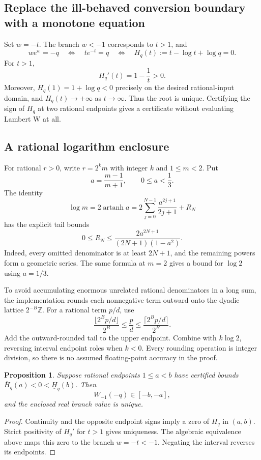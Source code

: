 \documentclass[11pt,letterpaper]{article}
\newtheorem{proposition}{Proposition}
\begin{document}
\subsection{Replace the ill-behaved conversion boundary with a monotone equation}

Set $w=-t$. The branch $w<-1$ corresponds to $t>1$, and
\[
 we^w=-q
 \quad\Longleftrightarrow\quad
 te^{-t}=q
 \quad\Longleftrightarrow\quad
 H_q(t):=t-\log t+\log q=0.
\]
For $t>1$,
\[
 H_q'(t)=1-\frac1t>0.
\]
Moreover, $H_q(1)=1+\log q<0$ precisely on the desired rational-input domain, and $H_q(t)\to+\infty$ as $t\to\infty$. Thus the root is unique. Certifying the sign of $H_q$ at two rational endpoints gives a certificate without evaluating Lambert W at all.

\subsection{A rational logarithm enclosure}

For rational $r>0$, write $r=2^k m$ with integer $k$ and $1\le m<2$. Put
\[
 a=\frac{m-1}{m+1},\qquad 0\le a<\frac13.
\]
The identity
\[
 \log m=2\operatorname{artanh}a
 =2\sum_{j=0}^{N-1}\frac{a^{2j+1}}{2j+1}+R_N
\]
has the explicit tail bounds
\[
 0\le R_N\le
 \frac{2a^{2N+1}}{(2N+1)(1-a^2)}.
\]
Indeed, every omitted denominator is at least $2N+1$, and the remaining powers form a geometric series. The same formula at $m=2$ gives a bound for $\log2$ using $a=1/3$.

To avoid accumulating enormous unrelated rational denominators in a long sum, the implementation rounds each nonnegative term outward onto the dyadic lattice $2^{-B}\mathbb Z$. For a rational term $p/d$, use
\[
 \frac{\lfloor2^B p/d\rfloor}{2^B}
 \le\frac pd\le
 \frac{\lceil2^B p/d\rceil}{2^B}.
\]
Add the outward-rounded tail to the upper endpoint. Combine with $k\log2$, reversing interval endpoint roles when $k<0$. Every rounding operation is integer division, so there is no assumed floating-point accuracy in the proof.

\begin{proposition}
Suppose rational endpoints $1\le a<b$ have certified bounds
$\overline H_q(a)<0<\underline H_q(b)$. Then
\[
 W_{-1}(-q)\in[-b,-a],
\]
and the enclosed real branch value is unique.
\end{proposition}
\begin{proof}
Continuity and the opposite endpoint signs imply a zero of $H_q$ in $(a,b)$. Strict positivity of $H_q'$ for $t>1$ gives uniqueness. The algebraic equivalence above maps this zero to the branch $w=-t<-1$. Negating the interval reverses its endpoints.
\end{proof}
\end{document}
